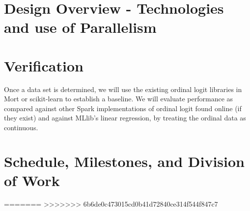 \documentclass{article}
\begin{document}
	\section{Design Overview - Technologies and use of Parallelism}

	\section{Verification}
	Once a data set is determined, we will use the existing ordinal logit libraries in Mort or scikit-learn to establish a baseline. We will evaluate performance as compared against other Spark implementations of ordinal logit found online (if they exist) and against MLlib's linear regression, by treating the ordinal data as continuous. 

	\section{Schedule, Milestones, and Division of Work}
=======
>>>>>>> 6b6de0c473015cd0b41d72840ce314f544f847c7
\end{document}
